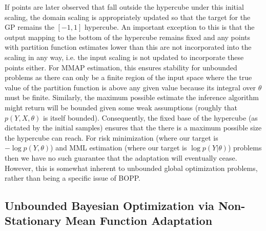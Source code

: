 If points are later observed that fall outside the hypercube under this initial scaling, the domain scaling 
is appropriately updated so that the target for the GP remains the $[-1,1]$ hypercube.  
An important exception to this is that the output mapping to the bottom of the hypercube remains 
fixed and any points with partition function estimates lower than this are not incorporated into the scaling in any way,
i.e. the input scaling is not updated to incorporate these points either.
For MMAP estimation, this ensures stability for unbounded problems as there can only be a finite region
of the input space where the true value of the partition function is above any given value because its integral
over $\theta$ must be finite.  Similarly, the
maximum possible estimate the inference algorithm might return will be bounded
given some weak assumptions (roughly that $p(Y,X,\theta)$ is itself bounded).
Consequently, the fixed base of the hypercube (as dictated by the initial samples) ensures that the 
there is a maximum possible size the hypercube can reach.
For risk minimization (where our target is $-\log p(Y,\theta)$) and  MML estimation
(where our target is $\log p(Y|\theta)$) problems then we have no such guarantee that the adaptation will 
eventually cease.  However, this is somewhat inherent to unbounded global optimization problems,
rather than being a specific issue of BOPP.

\subsection{Unbounded Bayesian Optimization via Non-Stationary Mean Function Adaptation}
\label{sec:bopp:unbounded}

